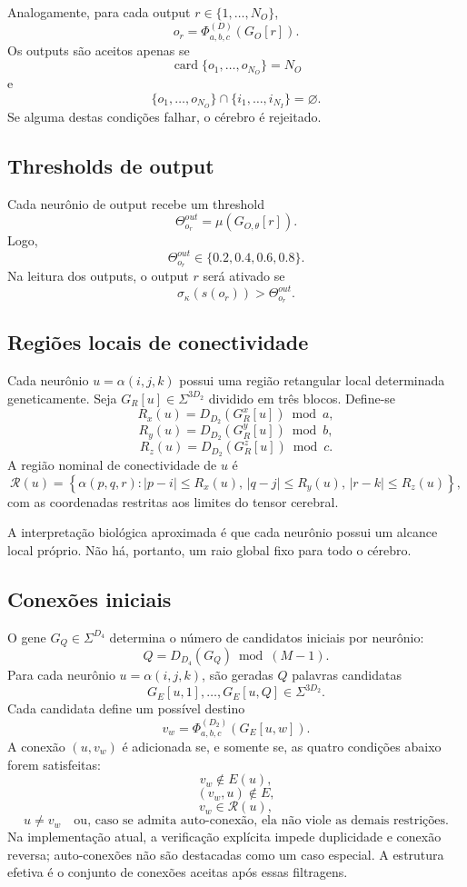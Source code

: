 \documentclass[12pt,a4paper,fleqn]{article}
\newcommand{\SigmaGen}{\Sigma}
\newcommand{\card}{\operatorname{card}}
\begin{document}
Analogamente, para cada output $r\in\{1,\ldots,N_O\}$,
$$
	o_r = \Phi_{a,b,c}^{(D)}(G_O[r]).
$$
Os outputs são aceitos apenas se
$$
	\card\{o_1,\ldots,o_{N_O}\}=N_O
$$
e
$$
	\{o_1,\ldots,o_{N_O}\}\cap\{i_1,\ldots,i_{N_I}\}=\varnothing.
$$
Se alguma destas condições falhar, o cérebro é rejeitado.

\subsection{Thresholds de output}

Cada neurônio de output recebe um threshold
$$
	\Theta^{out}_{o_r} = \mu(G_{O,\theta}[r]).
$$
Logo,
$$
	\Theta^{out}_{o_r}\in\{0.2,0.4,0.6,0.8\}.
$$
Na leitura dos outputs, o output $r$ será ativado se
$$
	\sigma_\kappa(s(o_r))>\Theta^{out}_{o_r}.
$$

\subsection{Regiões locais de conectividade}

Cada neurônio $u=\alpha(i,j,k)$ possui uma região retangular local determinada geneticamente. Seja $G_R[u]\in\SigmaGen^{3D_2}$ dividido em três blocos. Define-se
$$
	R_x(u)=D_{D_2}(G_R^x[u])\bmod a,
$$
$$
	R_y(u)=D_{D_2}(G_R^y[u])\bmod b,
$$
$$
	R_z(u)=D_{D_2}(G_R^z[u])\bmod c.
$$
A região nominal de conectividade de $u$ é
$$
	\mathcal{R}(u)=
	\left\{
		\alpha(p,q,r):
		|p-i|\leq R_x(u),\,
		|q-j|\leq R_y(u),\,
		|r-k|\leq R_z(u)
	\right\},
$$
com as coordenadas restritas aos limites do tensor cerebral.

A interpretação biológica aproximada é que cada neurônio possui um alcance local próprio. Não há, portanto, um raio global fixo para todo o cérebro.

\subsection{Conexões iniciais}

O gene $G_Q\in\SigmaGen^{D_4}$ determina o número de candidatos iniciais por neurônio:
$$
	Q = D_{D_4}(G_Q)\bmod(M-1).
$$
Para cada neurônio $u=\alpha(i,j,k)$, são geradas $Q$ palavras candidatas
$$
	G_E[u,1],\ldots,G_E[u,Q]\in\SigmaGen^{3D_2}.
$$
Cada candidata define um possível destino
$$
	v_w=\Phi_{a,b,c}^{(D_2)}(G_E[u,w]).
$$
A conexão $(u,v_w)$ é adicionada se, e somente se, as quatro condições abaixo forem satisfeitas:
$$
	v_w\notin E(u),
$$
$$
	(v_w,u)\notin E,
$$
$$
	v_w\in\mathcal{R}(u),
$$
$$
	u\neq v_w \quad\text{ou, caso se admita auto-conexão, ela não viole as demais restrições.}
$$
Na implementação atual, a verificação explícita impede duplicidade e conexão reversa; auto-conexões não são destacadas como um caso especial. A estrutura efetiva é o conjunto de conexões aceitas após essas filtragens.
\end{document}
